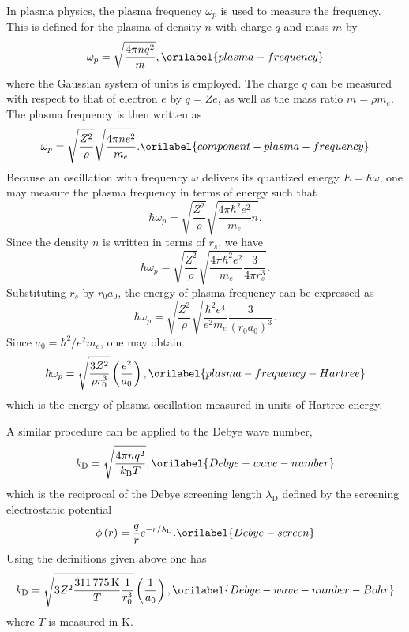 \documentclass[aps,showkeys,noshowpacs,superscriptaddress,pre,preprint]{revtex4-2}
\let\label\orilabel
\begin{document}
In plasma physics, the plasma frequency $\omega_p$ is used to measure the frequency.
This is defined for the plasma of density $n$ with charge $q$ and mass $m$ by
\begin{equation}
\omega_p = \sqrt{\frac{4\pi n q^2}{m}} ,
\label{plasma-frequency}
\end{equation}
where the Gaussian system of units is employed.
The charge $q$ can be measured with respect to that of electron $e$ by $q = Ze$,
as well as the mass ratio $m = \rho m_e$.
The plasma frequency is then written as
\begin{equation}
\omega_p = \sqrt{\frac{Z^2}{\rho}} \sqrt{\frac{4 \pi n e^2}{m_e} } .
\label{component-plasma-frequency}
\end{equation}
Because an oscillation with frequency $\omega$ delivers its quantized energy $E = \hbar \omega$,
one may measure the plasma frequency in terms of energy such that
\begin{equation*}
\hbar \omega_p = \sqrt{\frac{Z^2}{\rho}} \sqrt{\frac{4 \pi \hbar^2 e^2}{m_e} n} .
\end{equation*}
Since the density $n$ is written in terms of $r_s$,
we have
\begin{equation*}
\hbar \omega_p
= \sqrt{\frac{Z^2}{\rho}} \sqrt{\frac{4 \pi \hbar^2 e^2}{m_e} \frac{3}{4\pi r_s^3}} .
\end{equation*}
Substituting $r_s$ by $r_0 a_0$, the energy of plasma frequency can be expressed as
\begin{equation*}
\hbar\omega_p 
= \sqrt{\frac{Z^2}{\rho}} \sqrt{\frac{\hbar^2 e^4}{e^2 m_e} \frac{3}{\left( r_0 a_0\right)^3}} .
\end{equation*}
Since $a_0 = \hbar^2 / e^2 m_e$, one may obtain
\begin{equation}
\hbar \omega_p = \sqrt{\frac{3 Z^2}{\rho r_0^3}} \left( \frac{e^2}{a_0 } \right) ,
\label{plasma-frequency-Hartree}
\end{equation}
which is the energy of plasma oscillation measured in units of Hartree energy.

A similar procedure can be applied to the Debye wave number,
\begin{equation}
k_\mathrm{D} = \sqrt{\frac{4 \pi n q^2}{k_\mathrm{B} T}} ,
\label{Debye-wave-number}
\end{equation}
which is the reciprocal of the Debye screening length $\lambda_\mathrm{D}$
defined by the screening electrostatic potential
\begin{equation}
\phi\left( r \right) = \frac{q}{r} e^{-r / \lambda_\mathrm{D}} .
\label{Debye-screen}
\end{equation}
Using the definitions given above one has
\begin{equation}
k_\mathrm{D} = \sqrt{3 Z^2 \frac{311\,775\,\mathrm{K}}{T} \frac{1}{r_0^3}}
\left( \frac{1}{a_0} \right) ,
\label{Debye-wave-number-Bohr}
\end{equation}
where $T$ is measured in K.
\end{document}
